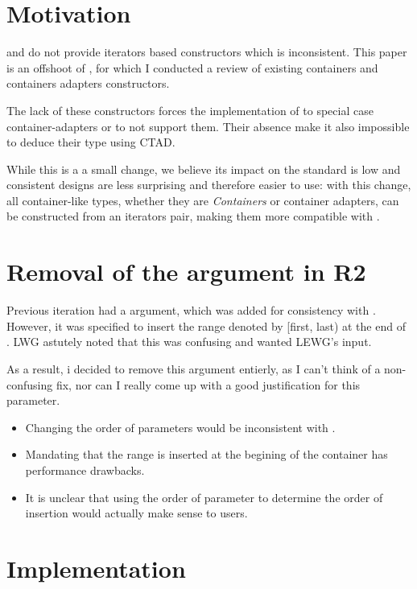 \documentclass{wg21}
\begin{document}
\section{Motivation}

 and  do not provide iterators based constructors which is inconsistent.
This paper is an offshoot of \cite{P1206}, for which I conducted a review of existing containers and containers adapters constructors.

The lack of these constructors forces the implementation of  to special case container-adapters or to not support them.
Their absence make it also impossible to deduce their type using CTAD.

While this is a a small change, we believe its impact on the standard is low and consistent designs are less surprising and therefore easier
to use: with this change, all container-like types, whether they are \emph{Containers} or container adapters, can be constructed from 
an iterators pair, making them more compatible with .


\section{Removal of the  argument in R2}

Previous iteration had a  argument, which was added for consistency
with .
However, it was specified to insert the range denoted by [first, last) at the end of .
LWG astutely noted that this was confusing and wanted LEWG's input.

As a result, i decided to remove this argument entierly, as I can't think of a non-confusing fix, 
nor can I really come up with a good justification for this parameter.

\begin{itemize}
\item Changing the order of parameters would be inconsistent with .
\item Mandating that the range is inserted at the begining of the container has performance drawbacks.
\item It is unclear that using the order of parameter to determine the order of insertion would actually make sense to users.
\end{itemize}

\section{Implementation}
\end{document}
